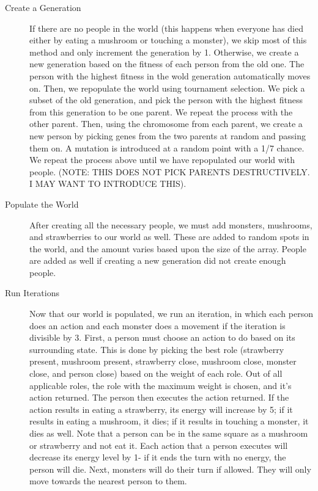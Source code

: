 \documentclass{article}
\begin{document}
\begin{description}
\item[Create a Generation]
If there are no people in the world (this happens when everyone has died either by eating a mushroom or touching a monster), we skip most of this method and only increment the generation by 1.  Otherwise, we create a new generation based on the fitness of each person from the old one.  The person with the highest fitness in the wold generation automatically moves on.  Then, we repopulate the world using tournament selection.  We pick a subset of the old generation, and pick the person with the highest fitness from this generation to be one parent.  We repeat the process with the other parent.  Then, using the chromosome from each parent, we create a new person by picking genes from the two parents at random and passing them on.  A mutation is introduced at a random point with a 1/7 chance.  We repeat the process above until we have repopulated our world with people. (NOTE: THIS DOES NOT PICK PARENTS DESTRUCTIVELY. I MAY WANT TO INTRODUCE THIS).
\item[Populate the World]
After creating all the necessary people, we must add monsters, mushrooms, and strawberries to our world as well.  These are added to random spots in the world, and the amount varies based upon the size of the array.  People are added as well if creating a new generation did not create enough people.
\item[Run Iterations]
Now that our world is populated, we run an iteration, in which each person does an action and each monster does a movement if the iteration is divisible by 3.  First, a person must choose an action to do based on its surrounding state.  This is done by picking the best role (strawberry present, mushroom present, strawberry close, mushroom close, monster close, and person close) based on the weight of each role.  Out of all applicable roles, the role with the maximum weight is chosen, and it's action returned.  The person then executes the action returned.  If the action results in eating a strawberry, its energy will increase by 5; if it results in eating a mushroom, it dies; if it results in touching a monster, it dies as well.  Note that a person can be in the same square as a mushroom or strawberry and not eat it.  Each action that a person executes will decrease its energy level by 1- if it ends the turn with no energy, the person will die.  Next, monsters will do their turn if allowed.  They will only move towards the nearest person to them.
\end{description}
\end{document}
